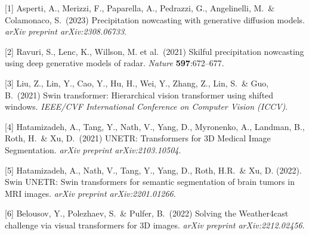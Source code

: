 \documentclass{article}
\begin{document}
\medskip

{
\small

[1] Asperti, A., Merizzi, F., Paparella, A., Pedrazzi, G., Angelinelli, M.\ \& Colamonaco, S.\ (2023) Precipitation nowcasting with generative diffusion models. {\it arXiv preprint arXiv:2308.06733}.

[2] Ravuri, S., Lenc, K., Willson, M. et al.\ (2021) Skilful precipitation nowcasting using deep generative models of radar. {\it Nature} {\bf 597}:672–677.

[3] Liu, Z., Lin, Y., Cao, Y., Hu, H., Wei, Y., Zhang, Z., Lin, S.\ \& Guo, B.\ (2021) Swin transformer: Hierarchical vision transformer using shifted windows. {\it IEEE/CVF International Conference on Computer Vision (ICCV)}.

[4] Hatamizadeh, A., Tang, Y., Nath, V., Yang, D., Myronenko, A., Landman, B., Roth, H.\ \& Xu, D.\ (2021) UNETR: Transformers for 3D Medical Image Segmentation. {\it arXiv preprint arXiv:2103.10504}.

[5] Hatamizadeh, A., Nath, V., Tang, Y., Yang, D., Roth, H.R.\ \& Xu, D. (2022). Swin UNETR: Swin transformers for semantic segmentation of brain tumors in MRI images.  {\it arXiv preprint arXiv:2201.01266}.

[6] Belousov, Y., Polezhaev, S.\ \& Pulfer, B.\ (2022) Solving the Weather4cast challenge via visual transformers for 3D images. {\it arXiv preprint arXiv:2212.02456}.

}

\end{document}
